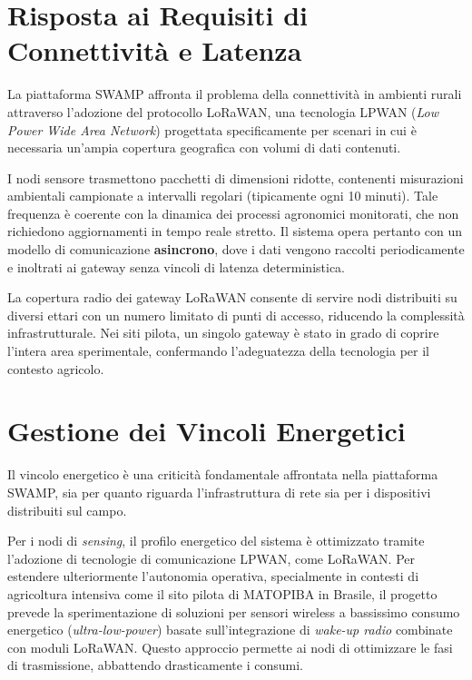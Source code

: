 \section{Risposta ai Requisiti di Connettività e Latenza}

La piattaforma SWAMP affronta il problema della connettività in ambienti rurali attraverso l'adozione del protocollo LoRaWAN, una tecnologia LPWAN (\textit{Low Power Wide Area Network}) progettata specificamente per scenari in cui è necessaria un'ampia copertura geografica con volumi di dati contenuti.

I nodi sensore trasmettono pacchetti di dimensioni ridotte, contenenti misurazioni ambientali campionate a intervalli regolari (tipicamente ogni 10 minuti). Tale frequenza è coerente con la dinamica dei processi agronomici monitorati, che non richiedono aggiornamenti in tempo reale stretto. Il sistema opera pertanto con un modello di comunicazione \textbf{asincrono}, dove i dati vengono raccolti periodicamente e inoltrati ai gateway senza vincoli di latenza deterministica.

La copertura radio dei gateway LoRaWAN consente di servire nodi distribuiti su diversi ettari con un numero limitato di punti di accesso, riducendo la complessità infrastrutturale. Nei siti pilota, un singolo gateway è stato in grado di coprire l'intera area sperimentale, confermando l'adeguatezza della tecnologia per il contesto agricolo.



\section{Gestione dei Vincoli Energetici}

Il vincolo energetico è una criticità fondamentale affrontata nella piattaforma SWAMP, sia per quanto riguarda l'infrastruttura di rete sia per i dispositivi distribuiti sul campo. %

Per i nodi di \textit{sensing}, il profilo energetico del sistema è ottimizzato tramite l'adozione di tecnologie di comunicazione LPWAN, come LoRaWAN. %
Per estendere ulteriormente l'autonomia operativa, specialmente in contesti di agricoltura intensiva come il sito pilota di MATOPIBA in Brasile, il progetto prevede la sperimentazione di soluzioni per sensori wireless a bassissimo consumo energetico (\textit{ultra-low-power}) basate sull'integrazione di \textit{wake-up radio} combinate con moduli LoRaWAN. %
Questo approccio permette ai nodi di ottimizzare le fasi di trasmissione, abbattendo drasticamente i consumi. %

